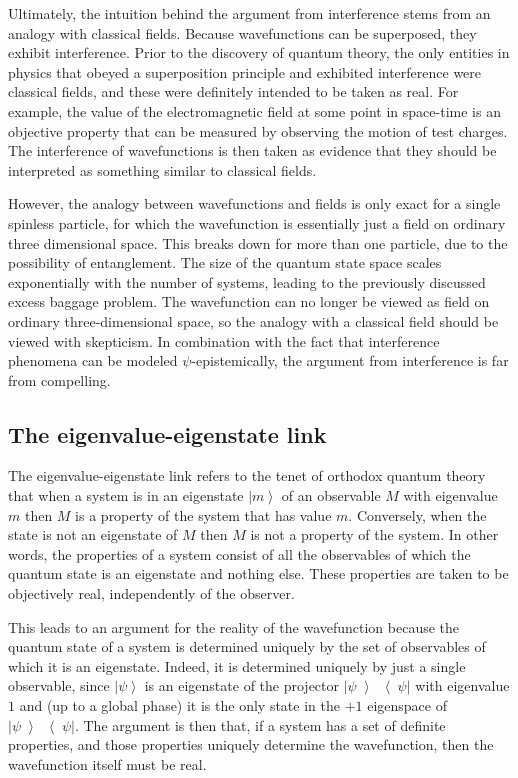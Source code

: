 \documentclass[DIV=calc,paper=a4,fontsize=11pt,twocolumn]{scrartcl} %
\theoremstyle{definition}
\theoremstyle{plain}
\newcommand{\Ket}[1]{\ensuremath{\left \vert #1 \right \rangle}}
\newcommand{\KetBra}[2]{\ensuremath{\left \vert #1 \middle \rangle
\middle \langle #2 \right \vert}}
\begin{document}
Ultimately, the intuition behind the argument from interference stems
from an analogy with classical fields.  Because wavefunctions can be
superposed, they exhibit interference.  Prior to the discovery of
quantum theory, the only entities in physics that obeyed a
superposition principle and exhibited interference were classical
fields, and these were definitely intended to be taken as real.  For
example, the value of the electromagnetic field at some point in
space-time is an objective property that can be measured by observing
the motion of test charges.  The interference of wavefunctions is then
taken as evidence that they should be interpreted as something similar
to classical fields.

However, the analogy between wavefunctions and fields is only exact
for a single spinless particle, for which the wavefunction is
essentially just a field on ordinary three dimensional space.  This
breaks down for more than one particle, due to the possibility of
entanglement.  The size of the quantum state space scales
exponentially with the number of systems, leading to the previously
discussed excess baggage problem.  The wavefunction can no longer be
viewed as field on ordinary three-dimensional space, so the analogy
with a classical field should be viewed with skepticism.  In
combination with the fact that interference phenomena can be modeled
$\psi$-epistemically, the argument from interference is far from
compelling.

\subsection{The eigenvalue-eigenstate link}

\label{EEL}

The eigenvalue-eigenstate link refers to the tenet of orthodox
quantum theory that when a system is in an eigenstate $\Ket{m}$ of an
observable $M$ with eigenvalue $m$ then $M$ is a property of the
system that has value $m$.  Conversely, when the state is not an
eigenstate of $M$ then $M$ is not a property of the system.  In other
words, the properties of a system consist of all the observables of
which the quantum state is an eigenstate and nothing else.  These
properties are taken to be objectively real, independently of the
observer.

This leads to an argument for the reality of the wavefunction because
the quantum state of a system is determined uniquely by the set of
observables of which it is an eigenstate.  Indeed, it is determined
uniquely by just a single observable, since $\Ket{\psi}$ is an
eigenstate of the projector $\KetBra{\psi}{\psi}$ with eigenvalue $1$
and (up to a global phase) it is the only state in the $+1$ eigenspace
of $\KetBra{\psi}{\psi}$.  The argument is then that, if a system has
a set of definite properties, and those properties uniquely determine
the wavefunction, then the wavefunction itself must be real.
\end{document}
